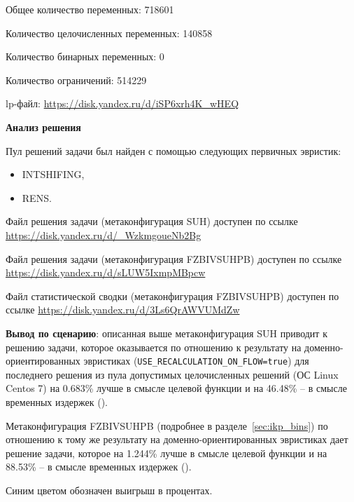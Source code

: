 \documentclass[%
	11pt,
	a4paper,
	utf8,
		]{article}
\begin{document}
Общее количество переменных: 718601

Количество целочисленных переменных: 140858

Количество бинарных переменных: 0

Количество ограничений: 514229

lp-файл: \url{https://disk.yandex.ru/d/iSP6xrh4K_wHEQ}

\vspace*{5mm}\textbf{Анализ решения}\vspace*{1mm}

Пул решений задачи был найден с помощью следующих первичных эвристик:
\begin{itemize}
	\item INTSHIFING,
	
	\item RENS.
\end{itemize}

Файл решения задачи (метаконфигурация SUH) доступен по ссылке \url{https://disk.yandex.ru/d/_WzkmgoueNb2Bg}

Файл решения задачи (метаконфигурация FZBIVSUHPB) доступен по ссылке \url{https://disk.yandex.ru/d/sLUW5IxmpMBpcw}

Файл статистической сводки (метаконфигурация FZBIVSUHPB) доступен по ссылке \url{https://disk.yandex.ru/d/3Ls6QrAWVUMdZw}

\vspace*{3mm}
\textbf{Вывод по сценарию}: описанная выше метаконфигурация SUH приводит к решению задачи, которое оказывается по отношению к результату на доменно-ориентированных эвристиках (\verb|USE_RECALCULATION_ON_FLOW=true|) для последнего решения из пула допустимых целочисленных решений (ОС Linux Centos 7) на 0.683\% лучше в смысле целевой функции и на 46.48\% -- в смысле временных издержек ().

Метаконфигурация FZBIVSUHPB (подробнее в разделе~\ref{sec:ikp_bins}) по отношению к тому же результату на доменно-ориентированных эвристиках дает решение задачи, которое на 1.244\% лучше в смысле целевой функции и на 88.53\% -- в смысле временных издержек ().

Синим цветом обозначен выигрыш в процентах.
\end{document}
